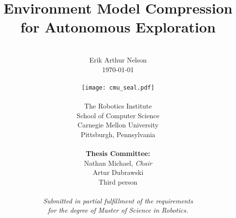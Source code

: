 \author{
  \\
        Erik Arthur Nelson \\
        \today \\
  \\
        \texttt{[image: cmu\_seal.pdf]}
  \\
  \\
        The Robotics Institute \\
        School of Computer Science \\
        Carnegie Mellon University \\
        Pittsburgh, Pennsylvania \\
  \\
        {\bf Thesis Committee:} \\
        Nathan Michael, {\it Chair} \\
        Artur Dubrawski \\
        Third person \\
  \\
        \textit{Submitted in partial fulfillment of the requirements} \\
        \textit{for the degree of Master of Science in Robotics.}
}

\title{\bf{
  Environment Model Compression for Autonomous Exploration
}}

\date{}
